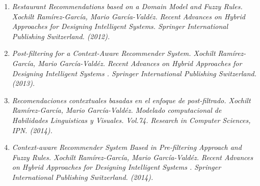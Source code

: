 
\begin{enumerate}
\item \textit{Restaurant Recommendations based on a Domain Model and Fuzzy Rules.  Xochilt Ram\'irez-Garc\'ia, Mario Garc\'ia-Vald\'ez. Recent Advances on Hybrid Approaches for Designing Intelligent Systems. Springer International Publishing Switzerland. (2012).}
\item \textit{Post-filtering for a Context-Aware Recommender System. Xochilt Ram\'irez-Garc\'ia, Mario Garc\'ia-Vald\'ez. Recent Advances on Hybrid Approaches for Designing Intelligent Systems . Springer International Publishing Switzerland. (2013).}
\item \textit{Recomendaciones contextuales basadas en el enfoque de post-filtrado. Xochilt Ram\'irez-Garc\'ia, Mario Garc\'ia-Vald\'ez. Modelado computacional de Habilidades Linguisticas y Visuales. Vol.74. Research in Computer Sciences, IPN. (2014).}
\item  \textit{Context-aware Recommender System Based in Pre-filtering Approach and Fuzzy Rules. Xochilt Ram\'irez-Garc\'ia, Mario Garc\'ia-Vald\'ez. Recent Advances on Hybrid Approaches for Designing Intelligent Systems . Springer International Publishing Switzerland. (2014).}
\end{enumerate}
